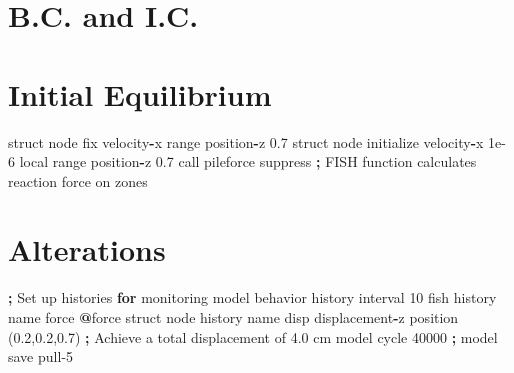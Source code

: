 \documentclass[a4paper, nobind]{templates/ociamthesis}
\newenvironment{Shaded}{\begin{snugshade}}{\end{snugshade}}
\newcommand{\BuiltInTok}[1]{#1}
\newcommand{\ControlFlowTok}[1]{\textcolor[rgb]{0.13,0.29,0.53}{\textbf{#1}}}
\newcommand{\DecValTok}[1]{\textcolor[rgb]{0.00,0.00,0.81}{#1}}
\newcommand{\FloatTok}[1]{\textcolor[rgb]{0.00,0.00,0.81}{#1}}
\newcommand{\NormalTok}[1]{#1}
\newcommand{\OperatorTok}[1]{\textcolor[rgb]{0.81,0.36,0.00}{\textbf{#1}}}
\newcommand{\StringTok}[1]{\textcolor[rgb]{0.31,0.60,0.02}{#1}}
\renewenvironment{Shaded}
{
  \vspace{10pt}%
  \begin{snugshade}%
}{%
  \end{snugshade}%
  \vspace{8pt}%
}
\begin{document}
\hypertarget{b.c.-and-i.c.-2}{%
\section{B.C. and I.C.}\label{b.c.-and-i.c.-2}}

\hypertarget{initial-equilibrium-2}{%
\section{Initial Equilibrium}\label{initial-equilibrium-2}}

\begin{Shaded}
\begin{Highlighting}[]
\NormalTok{struct node fix velocity}\OperatorTok{{-}}\NormalTok{x }\BuiltInTok{range}\NormalTok{ position}\OperatorTok{{-}}\NormalTok{z }\FloatTok{0.7}
\NormalTok{struct node initialize velocity}\OperatorTok{{-}}\NormalTok{x }\FloatTok{1e{-}6}\NormalTok{ local }\BuiltInTok{range}\NormalTok{ position}\OperatorTok{{-}}\NormalTok{z }\FloatTok{0.7}
\NormalTok{call }\StringTok{\textquotesingle{}pileforce\textquotesingle{}}\NormalTok{ suppress }\OperatorTok{;}\NormalTok{ FISH function calculates reaction force on zones}
\end{Highlighting}
\end{Shaded}

\hypertarget{alterations-2}{%
\section{Alterations}\label{alterations-2}}

\begin{Shaded}
\begin{Highlighting}[]
\OperatorTok{;}\NormalTok{ Set up histories }\ControlFlowTok{for}\NormalTok{ monitoring model behavior}
\NormalTok{history interval }\DecValTok{10}
\NormalTok{fish history name }\StringTok{\textquotesingle{}force\textquotesingle{}} \OperatorTok{@}\NormalTok{force}
\NormalTok{struct node history name }\StringTok{\textquotesingle{}disp\textquotesingle{}}\NormalTok{ displacement}\OperatorTok{{-}}\NormalTok{z position (}\FloatTok{0.2}\NormalTok{,}\FloatTok{0.2}\NormalTok{,}\FloatTok{0.7}\NormalTok{)}
\OperatorTok{;}\NormalTok{ Achieve a total displacement of }\FloatTok{4.0}\NormalTok{ cm}
\NormalTok{model cycle }\DecValTok{40000}
\OperatorTok{;}
\NormalTok{model save }\StringTok{\textquotesingle{}pull{-}5\textquotesingle{}}
\end{Highlighting}
\end{Shaded}
\end{document}
